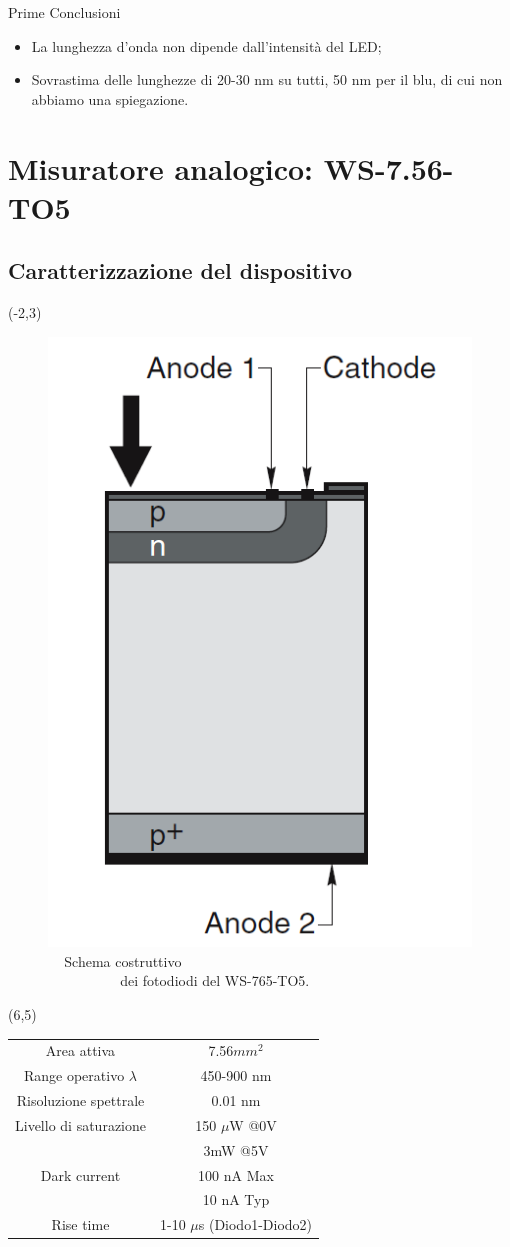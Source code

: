\documentclass{beamer}
\begin{document}
\begin{frame}{Prime Conclusioni}
\begin{itemize}
\item La lunghezza d'onda non dipende dall'intensità del LED;
\item Sovrastima delle lunghezze di 20-30 nm su tutti, 50 nm per il blu, di cui non abbiamo una spiegazione.
\end{itemize}
\end{frame}

\section{Misuratore analogico: WS-7.56-TO5}
\subsection{Caratterizzazione del dispositivo}

\begin{frame}
\begin{textblock}{10}(-2,3)
\begin{figure}
\centering
\includegraphics[width=0.4\linewidth]{./schema_analog_sensor}
\caption{$\, \, \, \, \, \, \,$Schema costruttivo \\
$\, \, \, \, \, \, \, \, \, \, \, \, \, \, \, \, \, \, \, \, \, \, \, \, \, \, \, \, \, \, \,$dei fotodiodi del WS-765-TO5.}
\label{fig:schema_analog_sensor}
\end{figure}
\end{textblock}

\begin{textblock}{7}(6,5)
\centering
\begin{tabular}{c|c}
\hline Area attiva & 7.56$mm^2$ \\ 
 Range operativo $\lambda$ & 450-900 nm \\ 
 Risoluzione spettrale & 0.01 nm \\ 
 Livello di saturazione & 150 $\mu$W @0V \\ 
  & 3mW @5V \\ 
 Dark current  & 100 nA Max\\ 
  & 10 nA Typ \\
 Rise time & 1-10 $\mu$s (Diodo1-Diodo2) \\
 
\hline
\end{tabular} 
\end{textblock}

\end{frame}
\end{document}
